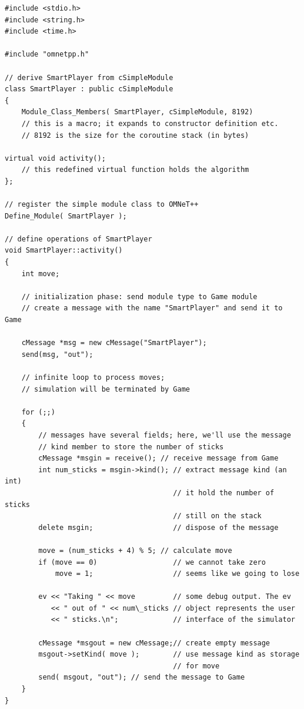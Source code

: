 \begin{Verbatim}
#include <stdio.h>
#include <string.h>
#include <time.h>

#include "omnetpp.h"

// derive SmartPlayer from cSimpleModule
class SmartPlayer : public cSimpleModule
{
    Module_Class_Members( SmartPlayer, cSimpleModule, 8192)
    // this is a macro; it expands to constructor definition etc.
    // 8192 is the size for the coroutine stack (in bytes)
 
virtual void activity(); 
    // this redefined virtual function holds the algorithm
};

// register the simple module class to OMNeT++
Define_Module( SmartPlayer );

// define operations of SmartPlayer
void SmartPlayer::activity()
{
    int move;

    // initialization phase: send module type to Game module
    // create a message with the name "SmartPlayer" and send it to Game

    cMessage *msg = new cMessage("SmartPlayer");
    send(msg, "out");

    // infinite loop to process moves;
    // simulation will be terminated by Game

    for (;;)
    {
        // messages have several fields; here, we'll use the message
        // kind member to store the number of sticks
        cMessage *msgin = receive(); // receive message from Game
        int num_sticks = msgin->kind(); // extract message kind (an int)
                                        // it hold the number of sticks
                                        // still on the stack
        delete msgin;                   // dispose of the message

        move = (num_sticks + 4) % 5; // calculate move
        if (move == 0)                  // we cannot take zero
            move = 1;                   // seems like we going to lose

        ev << "Taking " << move         // some debug output. The ev
           << " out of " << num\_sticks // object represents the user
           << " sticks.\n";             // interface of the simulator

        cMessage *msgout = new cMessage;// create empty message
        msgout->setKind( move );        // use message kind as storage 
                                        // for move
        send( msgout, "out"); // send the message to Game 
    }
}
\end{Verbatim}

